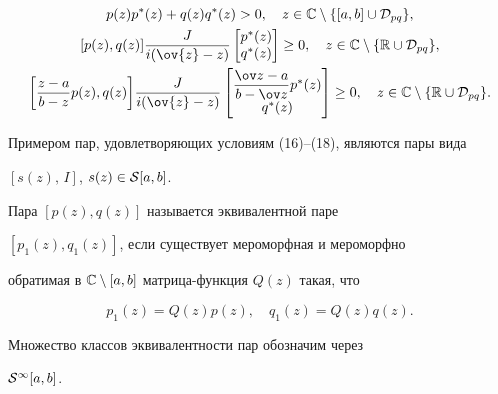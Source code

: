 \begin{gather}


p(z)p^*(z)+q(z)q^*(z) > 0,\quad


z\in {\Bbb C}\setminus \{[a,b] \cup {\cal D}_{pq} \},\\


%


[p(z),q(z)]\frac{J}{i(\ov{z}-z)}


\begin{bmatrix} p^*(z)\\q^*(z)\end{bmatrix}


\geq 0,\quad


z\in {\Bbb C}\setminus \{ {\Bbb R} \cup {\cal D}_{pq} \},\\


%


\bigg[\frac{z-a}{b-z}p(z), q(z)\bigg]


\frac{J}{i(\ov{z}-z)}


\begin{bmatrix} \dfrac{\ov z-a}{b-\ov z}p^*(z)\\


q^*(z)\end{bmatrix} \geq 0,\quad


z\in {\Bbb C}\setminus \{ {\Bbb R}\cup {\cal D}_{pq} \}.


\end{gather}


Примером пар, удовлетворяющих условиям (16)--(18), являются пары вида


$[s(z),\, I]$, $s(z) \in {\cal S}[a,b]$.





Пара $[p(z),q(z)]$ называется эквивалентной паре


$[p_1(z),q_1(z)]$, если существует мероморфная и мероморфно


обратимая в ${\Bbb C} \setminus [a,b]$ матрица-функция $Q(z)$ такая, что


$$


p_1(z)=Q(z)p(z),\quad q_1(z)=Q(z)q(z).


$$





Множество классов эквивалентности пар обозначим через


${\cal S}^{\infty}[a,b]$.





